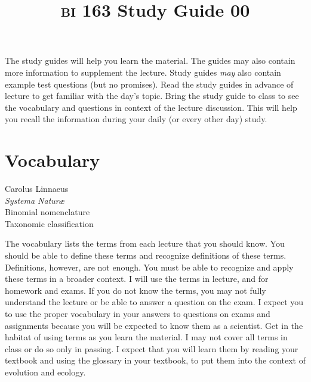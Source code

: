 \documentclass[letterpaper]{tufte-handout}
\title{{\scshape bi} 163 Study Guide 00\hfill}
\date{} %
\begin{document}
\maketitle	%



The study guides will help you learn the material. The guides may also contain more information to supplement the lecture. Study guides \emph{may} also contain example test questions (but no promises).  Read the study guides in advance of lecture to get familiar with the day's topic. Bring the study guide to class to see the vocabulary and questions in context of the lecture discussion. This will help you recall the information during your daily (or every other day) study.

\section{Vocabulary} 

\vspace{-1\baselineskip}
\begin{multicols}{2}
Carolus Linnaeus\\
\textit{Systema Natur\ae}\\
Binomial nomenclature\\
Taxonomic classification
\end{multicols}

The vocabulary lists the terms from each lecture that you should know. You should be able to define these terms and recognize definitions of these terms. Definitions, however, are not enough. You must be able to recognize and apply these terms in a broader context.  I will use the terms in lecture, and for homework and exams. If you do not know the terms, you may not fully understand the lecture or be able to answer a question on the exam. I expect you to use the proper vocabulary in your answers to questions on exams and assignments because you will be expected to know them as a scientist.  Get in the habitat of using terms as you learn the material.  I may not cover all terms in class or do so only in passing.  I expect that you will learn them by reading your textbook and using the glossary in your textbook, to put them into the context of evolution and ecology. 
\end{document}
